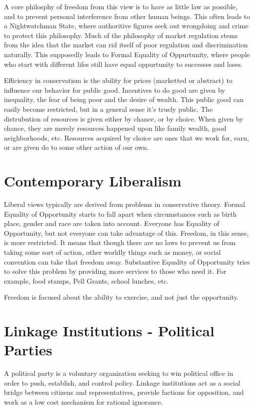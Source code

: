 \documentclass{article}
\begin{document}
A core philosphy of freedom from this view is to have as little law as possible, and to prevent personal interference from other human beings. This often leads to a Nightwatchman State, where authoritive figures seek out wrongdoing and crime to protect this philosophy.
Much of the philosophy of market regulation stems from the idea that the market can rid itself of poor regulation and discrimination naturally. This supposedly leads to Formal Equality of Oppurtunity, where people who start with different lifes still have equal oppurtunity to successes and loses.

Efficiency in conservatism is the ability for prices (marketted or abstract) to influence our behavior for public good. Incentives to do good are given by inequality, the fear of being poor and the desire of wealth. This public good can easily become restricted, but in a general sense it's truely public. The distrubution of resources is given either by chance, or by choice. When given by chance, they are merely resources happened upon like family wealth, good neighborhoods, etc. Resources acquired by choice are ones that we work for, earn, or are given do to some other action of our own.

\section{Contemporary Liberalism}
Liberal views typically are derived from problems in conservative theory. Formal Equality of Opportunity starts to fall apart when circumstances such as birth place, gender and race are taken into account. Everyone has Equality of Opportunity, but not everyone can take advantage of this. Freedom, in this sense, is more restricted. It means that though there are no laws to prevent us from taking some sort of action, other worldly things such as money, or social convention can take that freedom away. Substantive Equality of Opportunity tries to solve this problem by providing more services to those who need it. For example, food stamps, Pell Grants, school lunches, etc.

Freedom is focused about the ability to exercise, and not just the opportunity.

\section{Linkage Institutions - Political Parties}
A political party is a voluntary organization seeking to win political office in order to push, establish, and control policy. Linkage institutions act as a social bridge between citizens and representatives, provide factions for opposition, and work as a low cost mechanism for rational ignorance.
\end{document}
